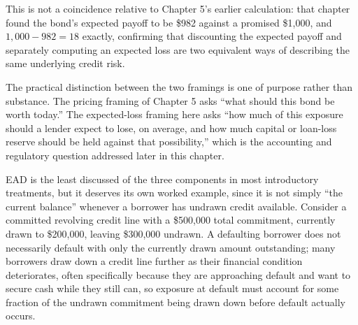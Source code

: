 \documentclass[../ai_in_finance]{subfiles}
\begin{document}
\begin{figure}[htbp]
\centering
\begin{lrbox}{\bookmeasuredbox}
\end{lrbox}
\ifdim\wd\bookmeasuredbox<0.65\linewidth
\setlength{\bookcapwidth}{0.65\linewidth}
\else
\setlength{\bookcapwidth}{\wd\bookmeasuredbox}
\fi
{}
\end{figure}
This is not a coincidence relative to Chapter 5's earlier calculation: that chapter found the bond's expected payoff to be \$982 against a promised \$1,000, and $1{,}000 - 982 = 18$ exactly, confirming that discounting the expected payoff and separately computing an expected loss are two equivalent ways of describing the same underlying credit risk.

The practical distinction between the two framings is one of purpose rather than substance. The pricing framing of Chapter 5 asks ``what should this bond be worth today.'' The expected-loss framing here asks ``how much of this exposure should a lender expect to lose, on average, and how much capital or loan-loss reserve should be held against that possibility,'' which is the accounting and regulatory question addressed later in this chapter.

EAD is the least discussed of the three components in most introductory treatments, but it deserves its own worked example, since it is not simply ``the current balance'' whenever a borrower has undrawn credit available. Consider a committed revolving credit line with a \$500,000 total commitment, currently drawn to \$200,000, leaving \$300,000 undrawn. A defaulting borrower does not necessarily default with only the currently drawn amount outstanding; many borrowers draw down a credit line further as their financial condition deteriorates, often specifically because they are approaching default and want to secure cash while they still can, so exposure at default must account for some fraction of the undrawn commitment being drawn down before default actually occurs.
\end{document}
